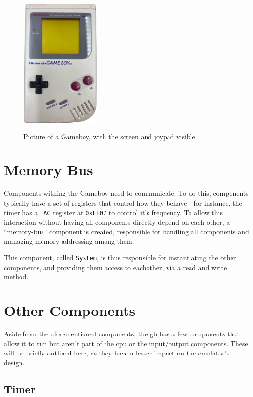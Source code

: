 \documentclass[11pt]{report}
\begin{document}
\begin{figure}[h]
    \centering
    \includegraphics[width=4cm]{images/gameboy}\\
    \caption{Picture of a Gameboy, with the screen and joypad visible}
    \label{fig:gb-front}
\end{figure}

\section{Memory Bus}

Components withing the Gameboy need to communicate. To do this, components typically have a set of registers that control how they behave - for instance, the timer has a \texttt{TAC} register at \texttt{0xFF07} to control it's frequency. To allow this interaction without having all components directly depend on each other, a ``memory-bus'' component is created, responsible for handling all components and managing memory-addressing among them.

This component, called \texttt{System}, is thus responsible for instantiating the other components, and providing them access to eachother, via a read and write method.

\section{Other Components}

Aside from the aforementioned components, the \gls{gb} has a few components that allow it to run but aren't part of the \gls{cpu} or the input/output components. These will be briefly outlined here, as they have a lesser impact on the emulator's design.

\subsection{Timer}
\end{document}
